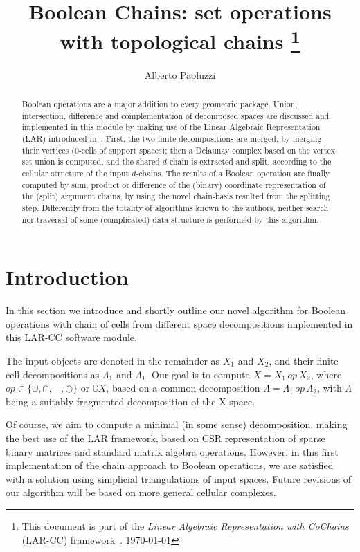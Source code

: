 \documentclass[11pt,oneside]{article}	%
\title{Boolean Chains: set operations with topological chains
\footnote{This document is part of the \emph{Linear Algebraic Representation with CoChains} (LAR-CC) framework~\cite{cclar-proj:2013:00}. \today}
}
\author{Alberto Paoluzzi}
\begin{document}
\maketitle

\begin{abstract}
Boolean operations are a major addition to every geometric package. Union, intersection, difference and complementation of decomposed spaces are discussed and implemented in this module by making use of the Linear Algebraic Representation (LAR) introduced in~\cite{Dicarlo:2014:TNL:2543138.2543294}. First, the two finite decompositions are merged, by merging their vertices (0-cells of support spaces); then a Delaunay complex based on the vertex set union is computed, and the shared $d$-chain is extracted and split, according to the cellular structure of the input $d$-chains. The results of a Boolean operation are finally computed by sum, product or difference of the (binary) coordinate representation of the (split) argument chains, by using the novel chain-basis resulted from the splitting step. Differently from the totality of algorithms known to the authors, neither search nor traversal of some (complicated) data structure is performed by this algorithm. 
\end{abstract}

\tableofcontents
\section{Introduction}

In this section we introduce and shortly outline our novel algorithm for Boolean operations with chain of cells from different space decompositions implemented in this LAR-CC software module.

The input objects are denoted in the remainder as $X_1$ and $X_2$, and their finite cell decompositions as $\Lambda_1$ and $\Lambda_1$. Our goal is to compute $X = X_1\, op\, X_2$, where $op \in \{\cup ,\cap , - ,\ominus \}$ or $\complement X$, based on a common decomposition $\Lambda = \Lambda_1\, op\, \Lambda_2$, with $\Lambda$ being a suitably fragmented decomposition of the X space.

Of course, we aim to compute a minimal (in some sense) decomposition, making the best use of the LAR framework, based on CSR representation of sparse binary matrices and standard matrix algebra operations.
However, in this first implementation of the chain approach to Boolean operations, we are satisfied with a solution using simplicial triangulations of input spaces. Future revisions of our algorithm will be based on more general cellular complexes.
\end{document}
